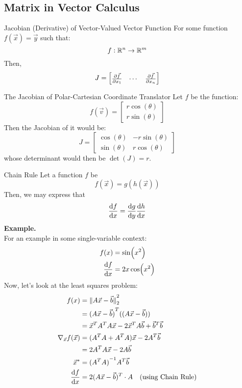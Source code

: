 \subsection{Matrix in Vector Calculus}
\begin{ln-define}{Jacobian (Derivative) of Vector-Valued Vector Function}{}
    For some function $f(\vec{x}) = \vec{y}$ such that:
    \[
        f: \R^n \rightarrow \R^m
    \]
    Then,
    \[
        J = \begin{bmatrix} \pdv{\vec{f}}{x_1} & \cdots & \pdv{\vec{f}}{x_n} \end{bmatrix}
    \]
\end{ln-define}

\begin{ln-explain}{The Jacobian of Polar-Cartesian Coordinate Translator}{}
    Let $f$ be the function:
    \[
        f(\vec{v}) = \begin{bmatrix} r \cos(\theta) \\ r \sin(\theta) \end{bmatrix}
    \]
    Then the Jacobian of it would be:
    \[
        J =
        \begin{bmatrix}
            \cos(\theta) & -r \sin(\theta) \\
            \sin(\theta) & r \cos(\theta)
        \end{bmatrix}
    \]
    whose determinant would then be $\det(J) = r$.
\end{ln-explain}
\begin{ln-define}{Chain Rule}{}
    Let a function $f$ be
    \[
        f(\vec{x}) = g(h(\vec{x}))
    \]
    Then, we may express that
    \[
        \dv{f}{x} = \dv{g}{y} \dv{h}{x}
    \]
    \tcblower
    \textbf{Example.} \\
    For an example in some single-variable context:
    \begin{align*}
        f(x) &= \sin(x^2) \\
        \dv{f}{x} &= 2x \cos(x^2)
    \end{align*}
    Now, let's look at the least squares problem:
    \begin{align*}
        f(x)
        &= \pnorm[2]{A \vec{x} - \vec{b}}{2} \\
        &= {(A \vec{x} - \vec{b})}^T ((A \vec{x} - \vec{b})) \\
        &= \vec{x}^T A^T A \vec{x} - 2 \vec{x}^T A \vec{b} + \vec{b}^T \vec{b} \\
        \nabla_{\vec{x}} f(\vec{x})
        &= (A^T A + A^T A) \vec{x} - 2 A^T \vec{b} \\
        &= 2 A^T A \vec{x} - 2 A \vec{b} \\
        \vec{x}^* &= {(A^T A)}^{-1} A^T \vec{b} \\
        \dv{f}{x}
        &= 2(A \vec{x} - \vec{b})^T \cdot A \text{\ \ \ (using Chain Rule)}
    \end{align*}
\end{ln-define}

